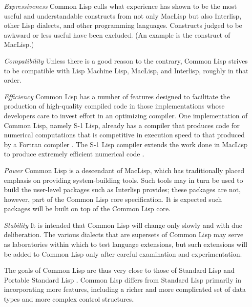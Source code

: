 \begin{flushdesc}
\item[\emph{Expressiveness}]
Common Lisp culls what
experience has shown to be the most useful and understandable constructs
from not only MacLisp but also
Interlisp, other Lisp dialects, and other programming languages.
Constructs judged to be awkward or less useful have been
excluded.   (An example is the  construct of MacLisp.)

\item[\emph{Compatibility}]
Unless there is a good reason to the contrary,
Common Lisp strives to be compatible with Lisp Machine Lisp, MacLisp, and
Interlisp, roughly in that order.

\item[\emph{Efficiency}]
Common Lisp has a number of features designed to
facilitate the production of high-quality compiled code in those
implementations whose developers
care to invest effort in an optimizing compiler.
One implementation of Common Lisp, namely S-1 Lisp, already has a compiler
that produces code for numerical computations that is competitive
in execution speed to that produced by a Fortran compiler \cite{S1-COMPILER}.
The S-1 Lisp compiler
extends the work done in MacLisp to produce extremely efficient
numerical code \cite{MACLISP-BEATS-FORTRAN}.

\item[\emph{Power}]
Common Lisp is a descendant of MacLisp, which has
traditionally placed emphasis on providing system-building tools.
Such tools may in turn be used to build the user-level packages
such as Interlisp provides; these packages are not, however, part
of the Common Lisp core specification.  It is expected such packages will
be built on top of the Common Lisp core.

\item[\emph{Stability}]
It is intended that Common Lisp
will change only slowly and with due deliberation.  The various dialects
that are supersets of Common Lisp may serve as laboratories within which to
test language extensions, but such extensions will be added to
Common Lisp only after careful examination and experimentation.
\end{flushdesc}

The goals of Common Lisp are thus very close to those of Standard Lisp
\cite{STANDARD-LISP-REPORT} and Portable Standard Lisp \cite{PSL-MANUAL}.
Common Lisp differs from Standard Lisp
primarily in incorporating more features, including a
richer and more complicated set of data types and more complex
control structures.

